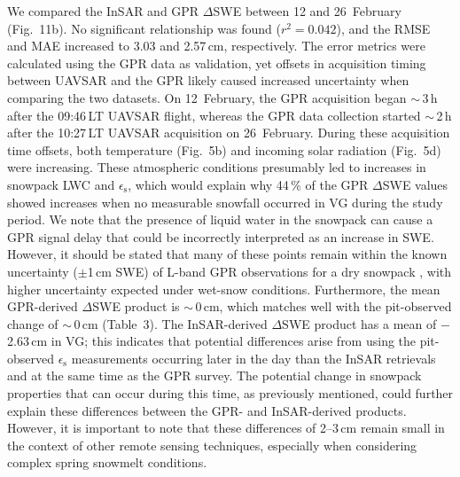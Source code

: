 We compared the InSAR and GPR $\Delta$SWE between 12 and 26~February (Fig.~11b). No significant relationship was found ($r^{2} = 0.042$), and the RMSE and MAE increased to 3.03 and 2.57\,cm, respectively. The error metrics were calculated using the GPR data as validation, yet offsets in acquisition timing between UAVSAR and the GPR likely caused increased uncertainty when comparing the two datasets. On 12~February, the GPR acquisition began $\sim$\,3\,h after the 09:46\,LT UAVSAR flight, whereas the GPR data collection started $\sim$\,2\,h after the 10:27\,LT UAVSAR acquisition on 26~February. During these acquisition time offsets, both temperature (Fig.~5b) and incoming solar radiation (Fig.~5d) were increasing. These atmospheric conditions presumably led to increases in snowpack LWC and $\epsilon_\mathrm{s}$, which would explain why 44\,\% of the GPR $\Delta$SWE values showed increases when no measurable snowfall occurred in VG during the study period. We note that the presence of liquid water in the snowpack can cause a GPR signal delay that could be incorrectly interpreted as an increase in SWE. However, it should be stated that many of these points remain within the known uncertainty ($\pm$1\,cm SWE) of L-band GPR observations for a dry snowpack \citep{mcgrathSpatiallyExtensiveGroundPenetrating2019}, with higher uncertainty expected under wet-snow conditions. Furthermore, the mean GPR-derived $\Delta$SWE product is $\sim$\,0\,cm, which matches well with the pit-observed change of $\sim$\,0\,cm (Table~3). The InSAR-derived $\Delta$SWE product has a mean of $-$2.63\,cm in VG; this indicates that potential differences arise from using the pit-observed $\epsilon_\mathrm{s}$ measurements occurring later in the day than the InSAR retrievals and at the same time as the GPR survey. The potential change in snowpack properties that can occur during this time, as previously mentioned, could further explain these differences between the GPR- and InSAR-derived products. However, it is important to note that these differences of 2--3\,cm remain small in the context of other remote sensing techniques, especially when considering complex spring snowmelt conditions.

